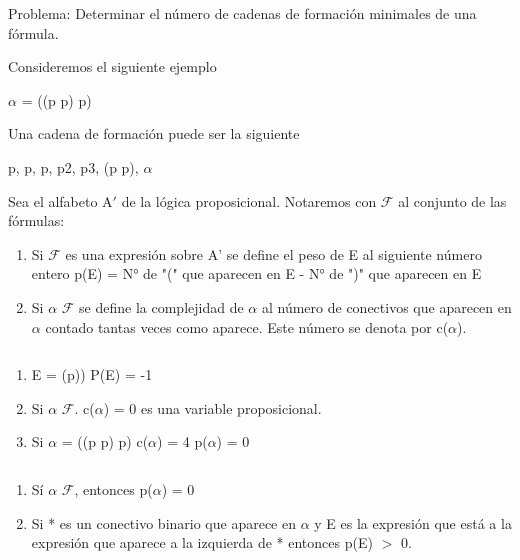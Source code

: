 \begin{example}

Problema: Determinar el n\'umero de cadenas de formaci\'on minimales de una f\'ormula.

Consideremos el siguiente ejemplo

$\alpha$ = ((\cneg \cneg p \then p) \then p)

Una cadena de formaci\'on puede ser la siguiente

p, \cneg p, \cneg\cneg p, p2, p3, (\cneg\cneg p \then p), $\alpha$

\end{example}

\begin{definition}
Sea el alfabeto A$'$ de la l\'ogica proposicional. Notaremos con $\mathcal{F}$ al conjunto de las f\'ormulas:

\begin{enumerate}
	\item Si $\mathcal{F}$ es una expresi\'on sobre A' se define el peso de E al siguiente n\'umero entero
	p(E) = {N° de "(" que aparecen en E} - { N° de ")" que aparecen en E}
	\item Si $\alpha$ \cin $\mathcal{F}$ se define la complejidad de $\alpha$ al n\'umero de conectivos 			que aparecen en $\alpha$ contado tantas veces como aparece. Este n\'umero se denota por c($			\alpha$).
\end{enumerate}
\end{definition}

\begin{example}
$\;$
\begin{enumerate}
	\item E = (p)) \then P(E) = -1
	\item Si $\alpha$ \cin $\mathcal{F}$. c($\alpha$) = 0 \ciff es una variable proposicional.
	\item Si $\alpha$ = ((\cneg\cneg p \then p) \then p) c($\alpha$) = 4 	p($\alpha$) = 0	
\end{enumerate}
\end{example}

\begin{proposition}
$\;$
\begin{enumerate}
	\item S\'i $\alpha$ \cin $\mathcal{F}$, entonces p($\alpha$) = 0
	\item Si * es un conectivo binario que aparece en $\alpha$ y E es la expresi\'on que está a la 	expresi\'on que aparece a la izquierda de * entonces p(E) $>$ 0.
\end{enumerate}
\end{proposition}

